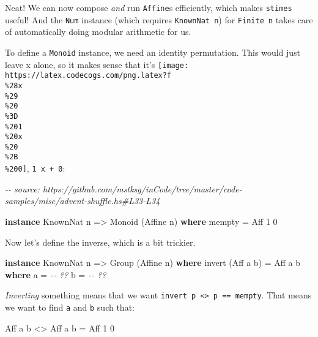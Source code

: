 \documentclass[]{article}
\newenvironment{Shaded}{}{}
\newcommand{\CommentTok}[1]{\textcolor[rgb]{0.38,0.63,0.69}{\textit{#1}}}
\newcommand{\DataTypeTok}[1]{\textcolor[rgb]{0.56,0.13,0.00}{#1}}
\newcommand{\DecValTok}[1]{\textcolor[rgb]{0.25,0.63,0.44}{#1}}
\newcommand{\FunctionTok}[1]{\textcolor[rgb]{0.02,0.16,0.49}{#1}}
\newcommand{\KeywordTok}[1]{\textcolor[rgb]{0.00,0.44,0.13}{\textbf{#1}}}
\newcommand{\NormalTok}[1]{#1}
\newcommand{\OperatorTok}[1]{\textcolor[rgb]{0.40,0.40,0.40}{#1}}
\newcommand{\OtherTok}[1]{\textcolor[rgb]{0.00,0.44,0.13}{#1}}
\begin{document}
Neat! We can now compose \emph{and} run \texttt{Affine}s efficiently, which
makes \texttt{stimes} useful! And the \texttt{Num} instance (which requires
\texttt{KnownNat\ n}) for \texttt{Finite\ n} takes care of automatically doing
modular arithmetic for us.

To define a \texttt{Monoid} instance, we need an identity permutation. This
would just leave x alone, so it makes sense that it's
\texttt{[image: https://latex.codecogs.com/png.latex?f\\\%28x\\\%29\\\%20\\\%3D\\\%201\\\%20x\\\%20\\\%2B\\\%200]},
\texttt{1\ x\ +\ 0}:

\begin{Shaded}
\begin{Highlighting}[]
\CommentTok{{-}{-} source: https://github.com/mstksg/inCode/tree/master/code{-}samples/misc/advent{-}shuffle.hs\#L33{-}L34}

\KeywordTok{instance} \DataTypeTok{KnownNat}\NormalTok{ n }\OtherTok{=>} \DataTypeTok{Monoid}\NormalTok{ (}\DataTypeTok{Affine}\NormalTok{ n) }\KeywordTok{where}
    \FunctionTok{mempty} \OtherTok{=} \DataTypeTok{Aff} \DecValTok{1} \DecValTok{0}
\end{Highlighting}
\end{Shaded}

Now let's define the inverse, which is a bit trickier.

\begin{Shaded}
\begin{Highlighting}[]
\KeywordTok{instance} \DataTypeTok{KnownNat}\NormalTok{ n }\OtherTok{=>} \DataTypeTok{Group}\NormalTok{ (}\DataTypeTok{Affine}\NormalTok{ n) }\KeywordTok{where}
\NormalTok{    invert (}\DataTypeTok{Aff}\NormalTok{ a b) }\OtherTok{=} \DataTypeTok{Aff}\NormalTok{ a\textquotesingle{} b\textquotesingle{}}
      \KeywordTok{where}
\NormalTok{        a\textquotesingle{} }\OtherTok{=} \CommentTok{{-}{-} ??}
\NormalTok{        b\textquotesingle{} }\OtherTok{=} \CommentTok{{-}{-} ??}
\end{Highlighting}
\end{Shaded}

\emph{Inverting} something means that we want
\texttt{invert\ p\ \textless{}\textgreater{}\ p\ ==\ mempty}. That means we want
to find \texttt{a\textquotesingle{}} and \texttt{b\textquotesingle{}} such that:

\begin{Shaded}
\begin{Highlighting}[]
      \DataTypeTok{Aff}\NormalTok{ a\textquotesingle{} b\textquotesingle{} }\OperatorTok{<>} \DataTypeTok{Aff}\NormalTok{ a b }\OtherTok{=} \DataTypeTok{Aff} \DecValTok{1} \DecValTok{0}
\end{Highlighting}
\end{Shaded}
\end{document}
